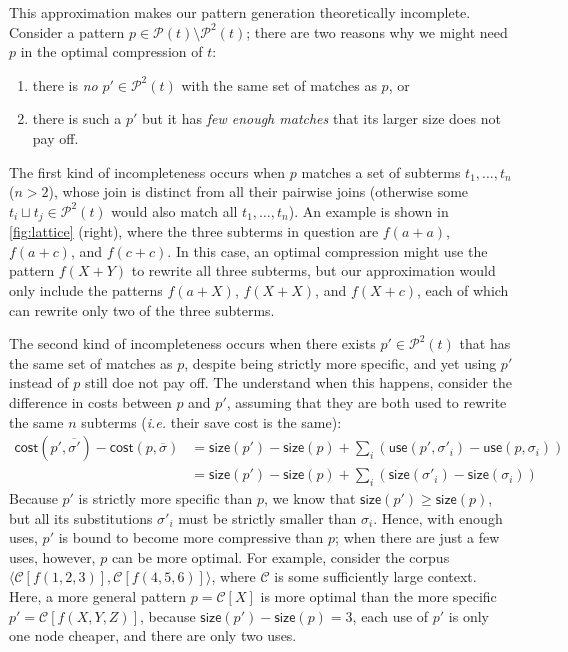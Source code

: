 \documentclass[acmsmall,screen,nonacm,review=false,timestamp=false]{acmart}
\newcommand{\ie}{\emph{i.e.}\xspace}
\newcommand{\many}[1]{\overline{#1}}
\newcommand{\sz}{\mathsf{size}}
\newcommand{\join}{\sqcup}
\newcommand{\pl}[1]{\mathcal{P}(#1)}
\newcommand{\plau}[1]{\mathcal{P}^2(#1)}
\newcommand{\ctx}{\mathcal{C}}
\begin{document}
This approximation makes our pattern generation theoretically incomplete.
Consider a pattern $p \in \pl{t}\setminus \plau{t}$;
there are two reasons why we might need $p$ in the optimal compression of $t$:
\begin{enumerate}
  \item there is \emph{no} $p' \in \plau{t}$ with the same set of matches as $p$, or
  \item there is such a $p'$ but it has \emph{few enough matches} 
  that its larger size does not pay off. 
\end{enumerate}


The first kind of incompleteness occurs when $p$ matches a set of subterms $t_1, \ldots, t_n$ ($n > 2$),
whose join is distinct from all their pairwise joins
(otherwise some $t_i \join t_j \in \plau{t}$ would also match all $t_1, \ldots, t_n$).
An example is shown in \autoref{fig:lattice} (right),
where the three subterms in question are $f(a+a)$, $f(a+c)$, and $f(c+c)$.
In this case, an optimal compression might use the pattern $f(X+Y)$ to rewrite all three subterms,
but our approximation would only include the patterns $f(a+X)$, $f(X+X)$, and $f(X+c)$,
each of which can rewrite only two of the three subterms.

The second kind of incompleteness occurs when there exists $p' \in \plau{t}$
that has the same set of matches as $p$, despite being strictly more specific,
and yet using $p'$ instead of $p$ still doe not pay off.
The understand when this happens, consider the difference in costs between $p$ and $p'$, 
assuming that they are both used to rewrite the same $n$ subterms
(\ie their \textsf{save} cost is the same):
\begin{align*}
  \mathsf{cost}(p', \many{\sigma'}) - \mathsf{cost}(p, \many{\sigma}) &= \sz(p') - \sz(p) + \sum_i (\mathsf{use}(p', \sigma'_i) - \mathsf{use}(p, \sigma_i))\\
  &= \sz(p') - \sz(p) + \sum_i (\sz(\sigma'_i) - \sz(\sigma_i))
\end{align*}
Because $p'$ is strictly more specific than $p$, we know that $\sz(p') \geq \sz(p)$,
but all its substitutions $\sigma'_i$ must be strictly smaller than $\sigma_i$.
Hence, with enough uses, $p'$ is bound to become more compressive than $p$;
when there are just a few uses, however, $p$ can be more optimal.
For example, consider the corpus $\langle \ctx[f(1,2,3)],  \ctx[f(4,5,6)]\rangle$,
where $\ctx$ is some sufficiently large context.
Here, a more general pattern $p = \ctx[X]$ is more optimal than the more specific $p' = \ctx[f(X,Y,Z)]$,
because $\sz(p') - \sz(p) = 3$, each use of $p'$ is only one node cheaper,
and there are only two uses. 
\end{document}
